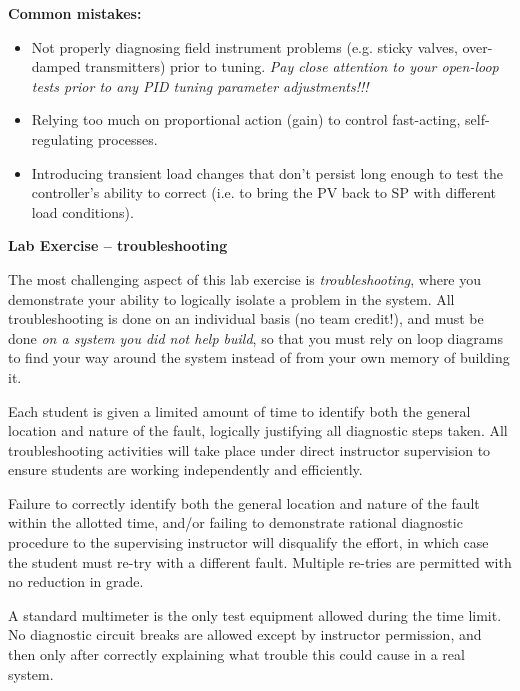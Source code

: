 \vfil

{\bf Common mistakes:}

\begin{itemize}
\item{} Not properly diagnosing field instrument problems (e.g. sticky valves, over-damped transmitters) prior to tuning.  {\it Pay close attention to your open-loop tests prior to any PID tuning parameter adjustments!!!}
\item{} Relying too much on proportional action (gain) to control fast-acting, self-regulating processes.
\item{} Introducing transient load changes that don't persist long enough to test the controller's ability to correct (i.e. to bring the PV back to SP with different load conditions).
\end{itemize}











\vfil \eject

\noindent
{\bf Lab Exercise -- troubleshooting}

\vskip 5pt

The most challenging aspect of this lab exercise is {\it troubleshooting}, where you demonstrate your ability to logically isolate a problem in the system.  All troubleshooting is done on an individual basis (no team credit!), and must be done {\it on a system you did not help build}, so that you must rely on loop diagrams to find your way around the system instead of from your own memory of building it.

Each student is given a limited amount of time to identify both the general location and nature of the fault, logically justifying all diagnostic steps taken.  All troubleshooting activities will take place under direct instructor supervision to ensure students are working independently and efficiently. 

Failure to correctly identify both the general location and nature of the fault within the allotted time, and/or failing to demonstrate rational diagnostic procedure to the supervising instructor will disqualify the effort, in which case the student must re-try with a different fault.  Multiple re-tries are permitted with no reduction in grade.

A standard multimeter is the only test equipment allowed during the time limit.  No diagnostic circuit breaks are allowed except by instructor permission, and then only after correctly explaining what trouble this could cause in a real system.  

